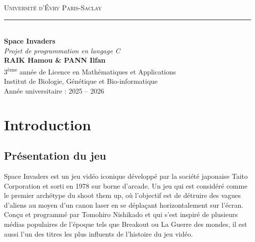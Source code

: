 \documentclass[12pt,a4paper]{report}
\begin{document}
\pagestyle{fancy}
\fancyhf{}  

\renewcommand{\headrulewidth}{1pt} 


\fancyhead[C]{\textit{\nouppercase{\leftmark}}}  
\fancyhead[R]{\today}                              
\fancyfoot[C]{\thepage}  

\begin{titlepage}
\thispagestyle{empty}

\begin{center}

\vspace*{1cm}

{\Large \textsc{Université d'Évry Paris-Saclay}}\\[0.5cm]
\rule{0.8\textwidth}{0.5pt}\\[1.5cm]

{\Huge \bfseries Space Invaders}\\[0.5cm]
{\Large \textit{Projet de programmation en langage C}}\\[2cm]


{\large \textbf{RAIK Hamou \& PANN Ilfan}}\\[1.5cm]


{\large 3\textsuperscript{ème} année de Licence en Mathématiques et Applications}\\
{\large Institut de Biologie, Génétique et Bio-informatique}\\[1.5cm]

\vspace{3cm}
{\large Année universitaire : 2025 -- 2026}

\vfill

\end{center}

\end{titlepage}


\tableofcontents
    \thispagestyle{fancy}


\newpage
\chapter{Introduction}

\section{Présentation du jeu}
    Space Invaders est un jeu vidéo iconique développé par la société japonaise Taito Corporation et sorti en 1978 sur borne d'arcade. Un jeu qui est considéré comme le premier archétype du shoot them up, où l'objectif est de détruire des vagues d'aliens au moyen d'un canon laser en se déplaçant horizontalement sur l'écran. Conçu et programmé par Tomohiro Nishikado et qui s'est inspiré  de plusieurs médias populaires de l'époque tels que Breakout ou La Guerre des mondes, il est aussi l'un des titres les plus influents de l'histoire du jeu vidéo.
\end{document}
